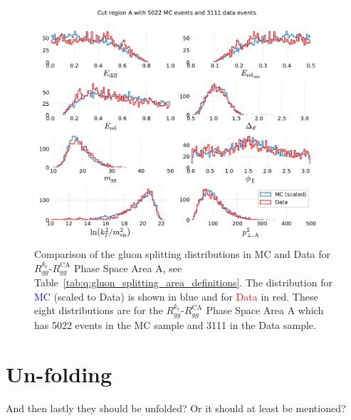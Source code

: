 \begin{figure}[h!]
  \centerfloat
  \includegraphics[width=0.95\textwidth, trim=0 0 0 0, clip]{figures/quarks/gtag-R_kt_CA_histograms-down_sample=1.00-ML_vars=vertex-selection=b-ejet_min=4-n_iter_RS_lgb=99-n_iter_RS_xgb=9-cdot_cut=0.90-version=19-njet=4.pdf}
  \caption[Gluon Splitting Distribution Comparison in MC and Data for $R_{gg}^{k_t}$-$R_{gg}^\mathrm{CA}$ Phase Space Area A]
          {Comparison of the gluon splitting distributions in MC and Data for $R_{gg}^{k_t}$-$R_{gg}^\mathrm{CA}$ Phase Space Area A, see Table~\ref{tab:q:gluon_splitting_area_definitions}. The distribution for \textcolor{blue}{MC} (scaled to Data) is shown in blue and for \textcolor{red}{Data} in red. These eight distributions are for the $R_{gg}^{k_t}$-$R_{gg}^\mathrm{CA}$ Phase Space Area A which has \num{5022} events in the MC sample and \num{3111} in the Data sample. } 
  \label{fig:q:R_kt_CA_cut_A_non_appendix}
\end{figure}

\section{Un-folding}

And then lastly they should be unfolded? Or it should at least be mentioned?

